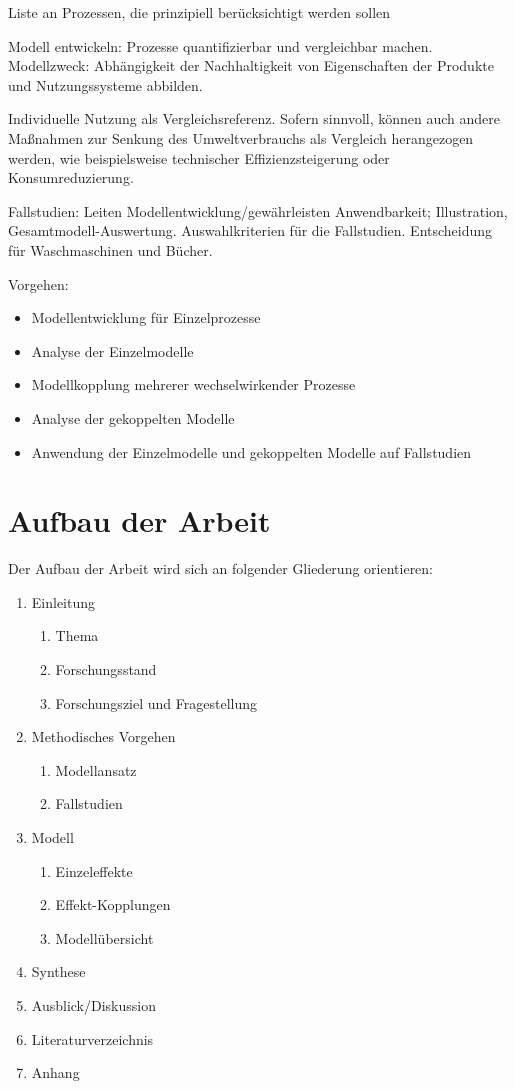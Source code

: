 \documentclass[11pt, titlepage=true]{scrartcl} %
\begin{document}
Liste an Prozessen, die prinzipiell berücksichtigt werden sollen

Modell entwickeln: Prozesse quantifizierbar und vergleichbar machen.  Modellzweck: Abhängigkeit der Nachhaltigkeit von Eigenschaften der Produkte und Nutzungssysteme abbilden.

Individuelle Nutzung als Vergleichsreferenz. Sofern sinnvoll, können auch andere Maßnahmen zur Senkung des Umweltverbrauchs als Vergleich herangezogen werden, wie beispielsweise technischer Effizienzsteigerung oder Konsumreduzierung.

Fallstudien: Leiten Modellentwicklung/gewährleisten Anwendbarkeit; Illustration, Gesamtmodell-Auswertung.
Auswahlkriterien für die Fallstudien. Entscheidung für Waschmaschinen und Bücher.

Vorgehen:
\begin{itemize}
	\item Modellentwicklung für Einzelprozesse
	\item Analyse der Einzelmodelle
	\item Modellkopplung mehrerer wechselwirkender Prozesse
	\item Analyse der gekoppelten Modelle
	\item Anwendung der Einzelmodelle und gekoppelten Modelle auf Fallstudien
\end{itemize}


\newpage
\section{Aufbau der Arbeit}
Der Aufbau der Arbeit wird sich an folgender Gliederung orientieren:

\begin{enumerate}
\item Einleitung
	\begin{enumerate}
		\item Thema
		\item Forschungsstand
		\item Forschungsziel und Fragestellung
	\end{enumerate}
\item Methodisches Vorgehen
	\begin{enumerate}
		\item Modellansatz
		\item Fallstudien
	\end{enumerate}
\item Modell
	\begin{enumerate}
		\item Einzeleffekte
		\item Effekt-Kopplungen
		\item Modellübersicht
	\end{enumerate}

\item Synthese
\item Ausblick/Diskussion
\item Literaturverzeichnis
\item Anhang
\end{enumerate}
\end{document}
